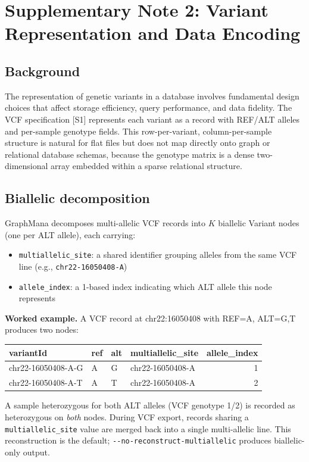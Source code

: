 \documentclass[11pt,a4paper]{article}
\begin{document}
\section{Supplementary Note 2: Variant Representation and Data Encoding}

\subsection*{Background}

The representation of genetic variants in a database involves fundamental design choices that affect storage efficiency, query performance, and data fidelity. The VCF specification [S1] represents each variant as a record with REF/ALT alleles and per-sample genotype fields. This row-per-variant, column-per-sample structure is natural for flat files but does not map directly onto graph or relational database schemas, because the genotype matrix is a dense two-dimensional array embedded within a sparse relational structure.

\subsection*{Biallelic decomposition}

GraphMana decomposes multi-allelic VCF records into $K$ biallelic Variant nodes (one per ALT allele), each carrying:
\begin{itemize}
\item \texttt{multiallelic\_site}: a shared identifier grouping alleles from the same VCF line (e.g., \texttt{chr22-16050408-A})
\item \texttt{allele\_index}: a 1-based index indicating which ALT allele this node represents
\end{itemize}

\noindent\textbf{Worked example.} A VCF record at chr22:16050408 with REF=A, ALT=G,T produces two nodes:

\begin{tabular}{llllr}
\toprule
variantId & ref & alt & multiallelic\_site & allele\_index \\
\midrule
chr22-16050408-A-G & A & G & chr22-16050408-A & 1 \\
chr22-16050408-A-T & A & T & chr22-16050408-A & 2 \\
\bottomrule
\end{tabular}

\vspace{6pt}
A sample heterozygous for both ALT alleles (VCF genotype 1/2) is recorded as heterozygous on \textit{both} nodes. During VCF export, records sharing a \texttt{multiallelic\_site} value are merged back into a single multi-allelic line. This reconstruction is the default; \texttt{-{}-no-reconstruct-multiallelic} produces biallelic-only output.
\end{document}
